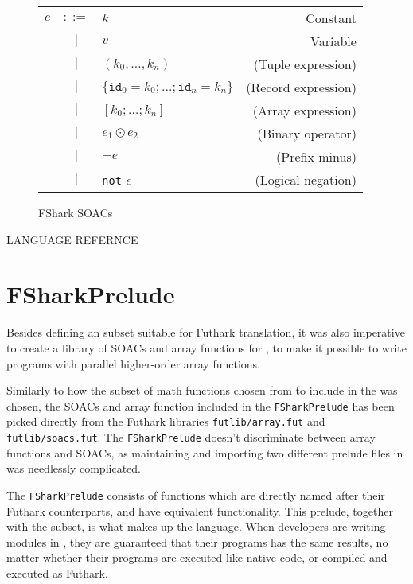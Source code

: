 \begin{figure}
  \centering
  \begin{tabular}{lclr}
    $e$ & $::=$ & $k$ & Constant \\
        & $|$   & $v$ & Variable \\
        & $|$   & $(k_0 , \ldots , k_n)$ & (Tuple expression) \\
        & $|$   & $\{\texttt{id}_0=k_0 ; \ldots ; \texttt{id}_n=k_n\}$ & (Record expression) \\
        & $|$   & $[k_0 ; \ldots ; k_n]$ & (Array expression) \\
        & $|$   & $e_1 \odot e_2$ & (Binary operator) \\
        & $|$   & $-e$ & (Prefix minus) \\
        & $|$   & \texttt{not} $e$ & (Logical negation) \\
  \end{tabular}
  \caption{FShark SOACs}
\end{figure}

LANGUAGE REFERNCE


\section{FSharkPrelude}
Besides defining an \fsharp{} subset suitable for Futhark translation, it was
also imperative to create a library of SOACs and array functions for \fshark{},
to make it possible to write programs with parallel higher-order array
functions.

Similarly to how the subset of math functions chosen from \fsharp{} to include in
the \fshark{} was chosen, the SOACs and array function included in the
\texttt{FSharkPrelude} has been picked directly from the Futhark libraries
\texttt{futlib/array.fut} and \texttt{futlib/soacs.fut}. The \texttt{FSharkPrelude} doesn't
discriminate between array functions and SOACs, as maintaining and importing two
different prelude files in \fshark{} was needlessly complicated.

The \texttt{FSharkPrelude} consists of functions which are directly named after
their Futhark counterparts, and have equivalent functionality.
This prelude, together with the \fshark{} subset, is what makes up the \fshark{} language.
When \fshark{} developers are writing modules in \fshark{}, they are guaranteed
that their \fshark{} programs has the same results, no matter whether their
programs are executed like native \fsharp{} code, or compiled and executed as
Futhark.

